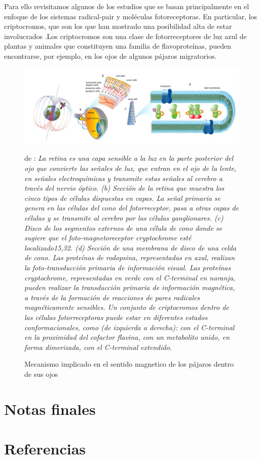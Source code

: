 \documentclass[1p]{elsarticle}
\begin{document}
Para ello revisitamos algunos de los estudios que se basan principalmente en el enfoque de los sistemas radical-pair y moléculas fotoreceptoras. En particular, los criptocromos, que son los que han mostrado una posibilidad alta de estar involucrados .Los criptocromos son una clase de fotorreceptores de luz azul de plantas y animales que constituyen una familia de flavoproteínas, pueden encontrarse, por ejemplo, en los ojos de algunos pájaros migratorios.




\begin{figure}
	\centering
	\includegraphics[width=1\textwidth]{ojos}
	\caption{Mecanismo implicado en el sentido magnetico de los pájaros dentro de sus ojos }
	\medskip
	\small
	de \cite{procopio2016inhomogeneous}: \textit{La retina es una capa sensible a la luz en la parte posterior del ojo que convierte las señales de luz, que entran en el ojo de la lente, en señales electroquímicas y transmite estas señales al cerebro a través del nervio óptico. (b) Sección de la retina que muestra los cinco tipos de células dispuestas en capas. La señal primaria se genera en las células del cono del fotorreceptor, pasa a otras capas de células y se transmite al cerebro por las células ganglionares. (c) Disco de los segmentos externos de una célula de cono donde se sugiere que el foto-magnetoreceptor cryptochrome esté localizado15,32. (d) Sección de una membrana de disco de una celda de cono. Las proteínas de rodopsina, representadas en azul, realizan la foto-transducción primaria de información visual. Las proteínas cryptochrome, representadas en verde con el C-terminal en naranja, pueden realizar la transducción primaria de información magnética, a través de la formación de reacciones de pares radicales magnéticamente sensibles. Un conjunto de criptocromos dentro de las células fotorreceptoras puede estar en diferentes estados conformacionales, como (de izquierda a derecha): con el C-terminal en la proximidad del cofactor flavina, con un metabolito unido, en forma dimerizada, con el C-terminal extendido.}

\end{figure}




\section{Notas finales}


\section*{Referencias}


\end{document}
